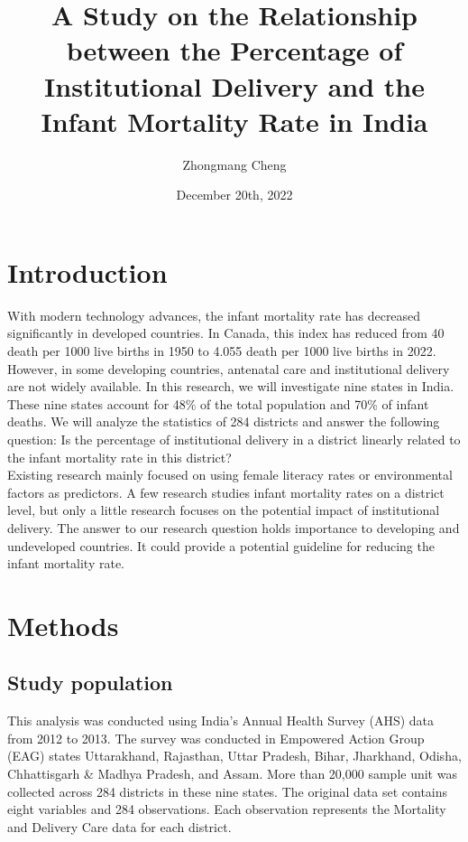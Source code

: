 \documentclass{article}
\title{{\myfont A Study on the Relationship between the Percentage of Institutional Delivery and the Infant Mortality Rate in India}}
\author{Zhongmang Cheng}
\date{December 20th, 2022}
\begin{document}
\maketitle

\section{Introduction}
With modern technology advances, the infant mortality rate has decreased significantly in developed countries. In Canada, this index has reduced from 40 death per 1000 live births in 1950 to 4.055 death per 1000 live births in 2022\cite{2022UN}. However, in some developing countries, antenatal care and institutional delivery are not widely available. In this research, we will investigate nine states in India. These nine states account for 48\% of the total population and 70\% of infant deaths. We will analyze the statistics of 284 districts and answer the following question: Is the percentage of institutional delivery in a district linearly related to the infant mortality rate in this district?\\

\noindent Existing research mainly focused on using female literacy rates or environmental factors as predictors\cite{gokhale_rao_garole_2022, greenstone_hanna_2011}. A few research studies infant mortality rates on a district level\cite{kapoor_2009}, but only a little research focuses on the potential impact of institutional delivery. The answer to our research question holds importance to developing and undeveloped countries. It could provide a potential guideline for reducing the infant mortality rate.

\section{Methods}
\subsection{Study population}
This analysis was conducted using India's Annual Health Survey (AHS) data from 2012 to 2013. The survey was conducted in Empowered Action Group (EAG) states Uttarakhand, Rajasthan, Uttar Pradesh, Bihar, Jharkhand, Odisha, Chhattisgarh \& Madhya Pradesh, and Assam. More than 20,000 sample unit was collected across 284 districts in these nine states. The original data set contains eight variables and 284 observations. Each observation represents the Mortality and Delivery Care data for each district. 
\end{document}
